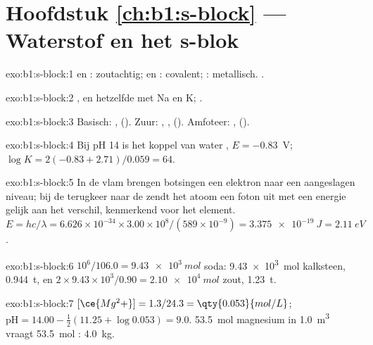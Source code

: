 \section*{Hoofdstuk \ref{ch:b1:s-block} --- Waterstof en het s-blok}

\begin{solution}{exo:b1:s-block:1}
 en : zoutachtig;  en : covalent;
: metallisch. .
\end{solution}

\begin{solution}{exo:b1:s-block:2}
, en hetzelfde met Na en K;
.
\end{solution}

\begin{solution}{exo:b1:s-block:3}
Basisch: ,  (). Zuur:
, ,  (). Amfoteer:
,  ().
\end{solution}

\begin{solution}{exo:b1:s-block:4}
Bij pH 14 is het koppel van water , $E = -0.83$~V;
$\log K = 2(-0.83 + 2.71)/0.059 = 64$.
\end{solution}

\begin{solution}{exo:b1:s-block:5}
In de vlam brengen botsingen een elektron naar een aangeslagen niveau;
bij de terugkeer naar de  zendt het atoom een foton uit met
een energie gelijk aan het verschil, kenmerkend voor het element.
$E = hc/\lambda = 6.626 \times 10^{-34} \times
3.00 \times 10^8/(589 \times 10^{-9}) = \qty{3.375e-19}{J} = \qty{2.11}{eV}$.
\end{solution}

\begin{solution}{exo:b1:s-block:6}
$10^6/106.0 = \qty{9.43e3}{mol}$ soda: \qty{9.43e3}{mol} kalksteen,
\qty{0.944}{t}, en $2 \times 9.43 \times 10^3/0.90 =
\qty{2.10e4}{mol}$ zout, \qty{1.23}{t}.
\end{solution}

\begin{solution}{exo:b1:s-block:7}
$[\ce{Mg^2+}] = 1.3/24.3 = \qty{0.053}{mol/L}$; $\mathrm{pH} = 14.00 -
\frac12(11.25 + \log 0.053) = 9.0$. \qty{53.5}{mol} magnesium in
\qty{1.0}{m^3} vraagt \qty{53.5}{mol} : \qty{4.0}{kg}.
\end{solution}


